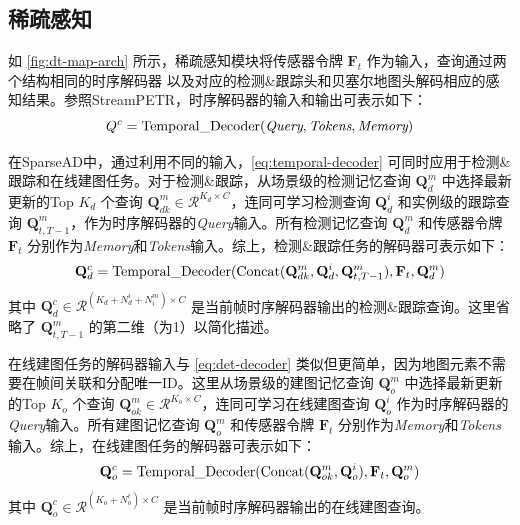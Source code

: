 \subsection{稀疏感知}
\label{appendix-imple-perception}

如 \cref{fig:dt-map-arch} 所示，稀疏感知模块将传感器令牌 $\textbf{F}_t$ 作为输入，查询通过两个结构相同的时序解码器\cite{wang2023exploring} 以及对应的检测\&跟踪头和贝塞尔地图头解码相应的感知结果。参照StreamPETR\cite{wang2023exploring}，时序解码器的输入和输出可表示如下：
\begin{equation}
Q^c = {\rm{Temporal}}\_{\rm{Decoder}}({\textit{Query}},{\textit{Tokens}},{\textit{Memory}})
\label{eq:temporal-decoder}
\end{equation}

在SparseAD中，通过利用不同的输入，\cref{eq:temporal-decoder} 可同时应用于检测\&跟踪和在线建图任务。对于检测\&跟踪，从场景级的检测记忆查询 $\mathbf{Q}^m_{d}$ 中选择最新更新的Top $K_d$ 个查询 $\mathbf{Q}^m_{dk} \in \mathcal{R}^{K_d \times C}$，连同可学习检测查询 $\mathbf{Q}^i_{d}$ 和实例级的跟踪查询 $\mathbf{Q}^m_{t,T-1}$，作为时序解码器的\textit{Query}输入。所有检测记忆查询 $\mathbf{Q}^m_{d}$ 和传感器令牌 $\textbf{F}_t$ 分别作为\textit{Memory}和\textit{Tokens}输入。综上，检测\&跟踪任务的解码器可表示如下：
\begin{equation}
\mathbf{Q}^c_d = {\rm{Temporal}}\_{\rm{Decoder}}(\text{Concat}(\mathbf{Q}^m_{dk},\mathbf{Q}^i_{d},\mathbf{Q}^m_{t,T-1}),\textbf{F}_t,\mathbf{Q}^m_{d})
\label{eq:det-decoder}
\end{equation}
其中 $\mathbf{Q}^c_d \in \mathcal{R}^{(K_d+N^i_d+N^m_i)\times C}$ 是当前帧时序解码器输出的检测\&跟踪查询。这里省略了 $\mathbf{Q}^m_{t,T-1}$ 的第二维（为1）以简化描述。

在线建图任务的解码器输入与 \cref{eq:det-decoder} 类似但更简单，因为地图元素不需要在帧间关联和分配唯一ID。这里从场景级的建图记忆查询 $\mathbf{Q}^m_{o}$ 中选择最新更新的Top $K_o$ 个查询 $\mathbf{Q}^m_{ok} \in \mathcal{R}^{K_o \times C}$，连同可学习在线建图查询 $\mathbf{Q}^i_{o}$ 作为时序解码器的\textit{Query}输入。所有建图记忆查询 $\mathbf{Q}^m_{o}$ 和传感器令牌 $\textbf{F}_t$ 分别作为\textit{Memory}和\textit{Tokens}输入。综上，在线建图任务的解码器可表示如下：
\begin{equation}
\mathbf{Q}^c_o = {\rm{Temporal}}\_{\rm{Decoder}}(\text{Concat}(\mathbf{Q}^m_{ok},\mathbf{Q}^i_{o}),\textbf{F}_t,\mathbf{Q}^m_{o})
\end{equation}
其中 $\mathbf{Q}^c_o \in \mathcal{R}^{(K_o+N^i_o)\times C}$ 是当前帧时序解码器输出的在线建图查询。

